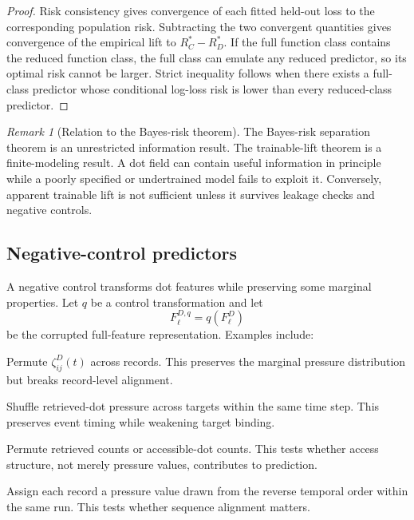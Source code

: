 \documentclass[11pt]{article}
\theoremstyle{remark}
\newtheorem{remark}{Remark}
\begin{document}
\begin{proof}
Risk consistency gives convergence of each fitted held-out loss to the
corresponding population risk. Subtracting the two convergent quantities gives
convergence of the empirical lift to $R_C^*-R_D^*$. If the full function class
contains the reduced function class, the full class can emulate any reduced
predictor, so its optimal risk cannot be larger. Strict inequality follows when
there exists a full-class predictor whose conditional log-loss risk is lower
than every reduced-class predictor.
\end{proof}

\begin{remark}[Relation to the Bayes-risk theorem]
The Bayes-risk separation theorem is an unrestricted information result. The
trainable-lift theorem is a finite-modeling result. A dot field can contain
useful information in principle while a poorly specified or undertrained model
fails to exploit it. Conversely, apparent trainable lift is not sufficient unless
it survives leakage checks and negative controls.
\end{remark}

\subsection{Negative-control predictors}\label{trainable-negative-control-predictors}

A negative control transforms dot features while preserving some marginal
properties. Let $q$ be a control transformation and let
\[
F^{D,q}_\ell=q(F^D_\ell)
\]
be the corrupted full-feature representation. Examples include:

\begin{description}[leftmargin=3.2cm,style=nextline]
\item[Pressure shuffle]
Permute $\zeta_{ij}^{D}(t)$ across records. This preserves the marginal pressure
distribution but breaks record-level alignment.

\item[Target shuffle]
Shuffle retrieved-dot pressure across targets within the same time step. This
preserves event timing while weakening target binding.

\item[Access shuffle]
Permute retrieved counts or accessible-dot counts. This tests whether access
structure, not merely pressure values, contributes to prediction.

\item[Temporal reversal]
Assign each record a pressure value drawn from the reverse temporal order within
the same run. This tests whether sequence alignment matters.
\end{description}
\end{document}
